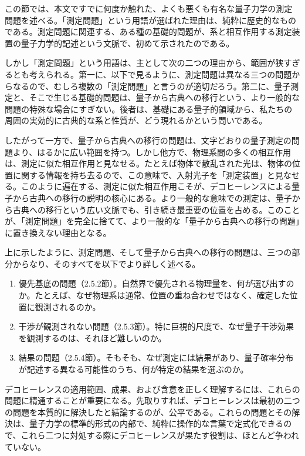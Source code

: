 この節では、本文ですでに何度か触れた、よくも悪くも有名な量子力学の測定問題を述べる。「測定問題」という用語が選ばれた理由は、純粋に歴史的なものである。測定問題に関連する、ある種の基礎的問題が、系と相互作用する測定装置の量子力学的記述という文脈で、初めて示されたのである。

しかし「測定問題」という用語は、主として次の二つの理由から、範囲が狭すぎるとも考えられる。第一に、以下で見るように、測定問題は異なる三つの問題からなるので、むしろ複数の「測定問題」と言うのが適切だろう。第二に、量子測定と、そこで生じる基礎的問題は、量子から古典への移行という、より一般的な問題の特殊な場合にすぎない。後者は、基礎にある量子的領域から、私たちの周囲の実効的に古典的な系と性質が、どう現れるかという問いである。

したがって一方で、量子から古典への移行の問題は、文字どおりの量子測定の問題より、はるかに広い範囲を持つ。しかし他方で、物理系間の多くの相互作用は、測定に似た相互作用と見なせる。たとえば物体で散乱された光は、物体の位置に関する情報を持ち去るので、この意味で、入射光子を「測定装置」と見なせる。このように遍在する、測定に似た相互作用こそが、デコヒーレンスによる量子から古典への移行の説明の核心にある。より一般的な意味での測定は、量子から古典への移行という広い文脈でも、引き続き最重要の位置を占める。このことが、「測定問題」を完全に捨てて、より一般的な「量子から古典への移行の問題」に置き換えない理由となる。

\hypertarget{srcpage:50}{}\label{srcpage:50}
上に示したように、測定問題、そして量子から古典への移行の問題は、三つの部分からなり、そのすべてを以下でより詳しく述べる。
\begin{enumerate}
\item 優先基底の問題（2.5.2節）。自然界で優先される物理量を、何が選び出すのか。たとえば、なぜ物理系は通常、位置の重ね合わせではなく、確定した位置に観測されるのか。
\item 干渉が観測されない問題（2.5.3節）。特に巨視的尺度で、なぜ量子干渉効果を観測するのは、それほど難しいのか。
\item 結果の問題（2.5.4節）。そもそも、なぜ測定には結果があり、量子確率分布が記述する異なる可能性のうち、何が特定の結果を選ぶのか。
\end{enumerate}
デコヒーレンスの適用範囲、成果、および含意を正しく理解するには、これらの問題に精通することが重要になる。先取りすれば、デコヒーレンスは最初の二つの問題を本質的に解決したと結論するのが、公平である。これらの問題とその解決は、量子力学の標準的形式の内部で、純粋に操作的な言葉で定式化できるので、これら二つに対処する際にデコヒーレンスが果たす役割は、ほとんど争われていない。

